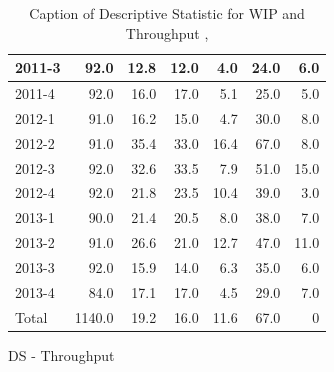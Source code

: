 \documentclass[UKenglish]{ifimaster}  %
\begin{document}
\begin{appendices}
\begin{table}[!htbp]
\begin{adjustwidth}{-2.5cm}{}
\begin{subfigure}[b]{0.3\textwidth}
{\begin{tabular}{ | l | r | r | r | r | r | r | }
2011-3 & 92.0 & 12.8 & 12.0 & 4.0 & 24.0 & 6.0\\ \hline
2011-4 & 92.0 & 16.0 & 17.0 & 5.1 & 25.0 & 5.0\\ \hline
2012-1 & 91.0 & 16.2 & 15.0 & 4.7 & 30.0 & 8.0\\ \hline
2012-2 & 91.0 & 35.4 & 33.0 & 16.4 & 67.0 & 8.0\\ \hline
2012-3 & 92.0 & 32.6 & 33.5 & 7.9 & 51.0 & 15.0\\ \hline
2012-4 & 92.0 & 21.8 & 23.5 & 10.4 & 39.0 & 3.0\\ \hline
2013-1 & 90.0 & 21.4 & 20.5 & 8.0 & 38.0 & 7.0\\ \hline
2013-2 & 91.0 & 26.6 & 21.0 & 12.7 & 47.0 & 11.0\\ \hline
2013-3 & 92.0 & 15.9 & 14.0 & 6.3 & 35.0 & 6.0\\ \hline
2013-4 & 84.0 & 17.1 & 17.0 & 4.5 & 29.0 & 7.0\\ \hline
Total & 1140.0 & 19.2 & 16.0 & 11.6 & 67.0 & 0\\ \hline
\end{tabular}
}
\caption{DS - Throughput}
 \label{DS:Throughput:9}
\end{subfigure}
\end{adjustwidth}
\caption[Optional caption for list of figures]{Caption of Descriptive Statistic for WIP and Throughput  , }
\label{DS:9:1}
\end{table}


\end{appendices}
\end{document}
